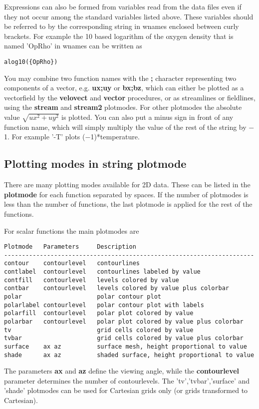    Expressions can also be formed from variables read from the data files
   even if they not occur among the standard variables listed above.
   These variables should be referred to by the corresponding string 
   in wnames enclosed between curly brackets.
   For example the 10 based logarithm of the oxygen density that is named 
   'OpRho' in wnames can be written as
\begin{verbatim}
alog10({OpRho})
\end{verbatim}
   You may combine two function names with the {\bf ;} character representing
   two components of a vector, 
   e.g. {\bf ux;uy} or {\bf bx;bz}, which can either be plotted as a 
   vectorfield by the {\bf velovect} and {\bf vector} procedures, 
   or as streamlines or fieldlines, using the 
   {\bf stream} and {\bf stream2} plotmodes.
   For other plotmodes the absolute value
   $\sqrt{ux^2+uy^2}$ is plotted.
   You can also put a minus sign in front of any function name, which
   will simply multiply the value of the rest of the string by $-$1. 
   For example '-T' plots ($-$1)*temperature.

\subsection{Plotting modes in string plotmode \label{s-plotmode}}

   There are many plotting modes available for 2D data. These can be
   listed in the {\bf plotmode} for each function separated by spaces.
   If the number of plotmodes is less than the number of functions,
   the last plotmode is applied for the rest of the functions.

   For scalar functions the main plotmodes are 
\begin{verbatim}
Plotmode   Parameters     Description
----------------------------------------------------------------------
contour    contourlevel   contourlines
contlabel  contourlevel   contourlines labeled by value
contfill   contourlevel   levels colored by value
contbar    contourlevel   levels colored by value plus colorbar
polar                     polar contour plot
polarlabel contourlevel   polar contour plot with labels
polarfill  contourlevel   polar plot colored by value
polarbar   contourlevel   polar plot colored by value plus colorbar
tv                        grid cells colored by value
tvbar                     grid cells colored by value plus colorbar
surface    ax az          surface mesh, height proportional to value
shade      ax az          shaded surface, height proportional to value
\end{verbatim}
   The parameters {\bf ax} and {\bf az} define the viewing angle,
   while the {\bf contourlevel} parameter determines the number 
   of contourlevels. The 'tv','tvbar','surface' and 'shade' plotmodes
   can be used for Cartesian grids only (or grids transformed to Cartesian).

